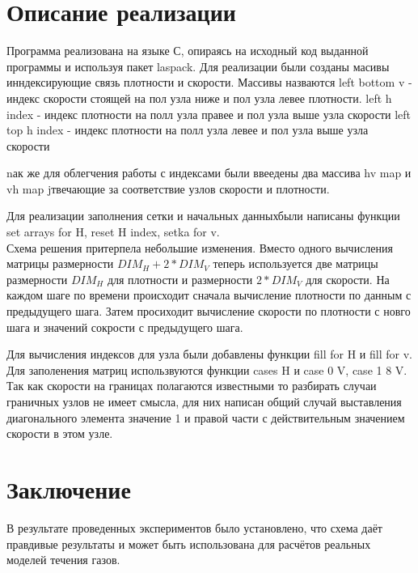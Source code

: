 \documentclass[a4paper, 25pt]{article}
\begin{document}
\section{Описание реализации}
Программа реализована на языке С, опираясь на исходный код выданной программы и используя пакет laspack.
Для реализации были созданы масивы инндексирующие связь плотности и скорости. Массивы назваются left bottom v - индекс скорости стоящей на пол узла ниже и пол узла левее плотности.
left h index -  индекс плотности на полл узла правее и пол узла выше узла скорости
left top h index -  индекс плотности на полл узла левее и пол узла выше узла скорости

nак же для облегчения работы с индексами были ввеедены два массива hv map и vh map jтвечающие за соответствие узлов скорости и плотности.

Для реализации заполнения сетки и начальных данныхбыли написаны функции set arrays for H, reset H index, setka for v.\\
Схема решения притерпела небольшие изменения. Вместо одного вычисления матрицы размерности $DIM_H + 2 * DIM_V$ теперь используется две матрицы размерности $DIM_H$ для плотности  и размерности $2 * DIM_V$ для скорости. На каждом шаге по времени происходит сначала вычисление плотности по данным с предыдущего шага. Затем просиходит вычисление скорости по плотности с новго шага и значений сокрости с предыдущего шага. 

Для вычисления индексов для узла были добавлены функции fill for H и fill for v.
Для заполенения матриц использвуются функции cases H и case 0 V, case 1 8 V. Так как скорости на границах полагаются известными то разбирать случаи граничных узлов не имеет смысла, для них написан общий случай выставления диагонального элемента значение 1 и правой части с действительным значением скорости в этом узле.

\section{Заключение}
В результате проведенных экспериментов было установлено, что схема даёт правдивые результаты и может быть использована для расчётов реальных моделей течения газов. 
\end{document}
